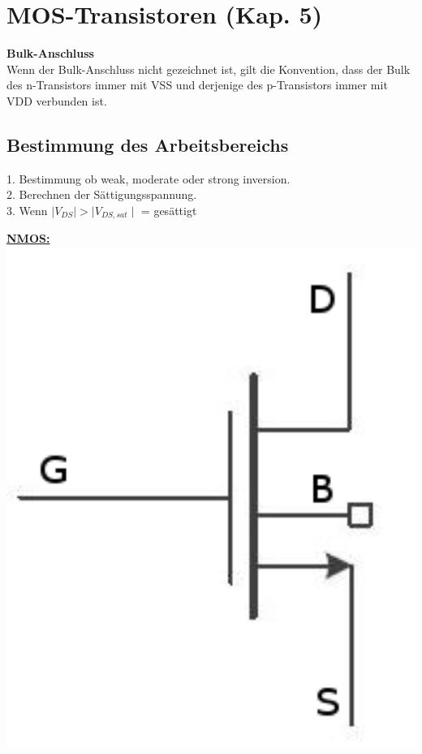 
\section{MOS-Transistoren (Kap. 5)}

\begin{minipage}[c]{0.54\textwidth}
	\textbf{Bulk-Anschluss}\\
	Wenn der Bulk-Anschluss nicht gezeichnet ist, gilt die Konvention, dass der Bulk des n-Transistors immer mit VSS und derjenige des p-Transistors immer mit VDD verbunden ist.
	\subsection{Bestimmung des Arbeitsbereichs}
	1. Bestimmung ob weak, moderate oder strong inversion.\\
	2. Berechnen der Sättigungsspannung.\\
	3. Wenn $\mid V_{DS}\mid > \mid V_{DS,sat}\mid$ = gesättigt
\end{minipage}
\begin{minipage}[c]{0.13\textwidth}
	\uline{\textbf{NMOS:}}\\
\includegraphics[width=1\textwidth]{chapters/Transistoren/images/N-MOS}
\end{minipage}
